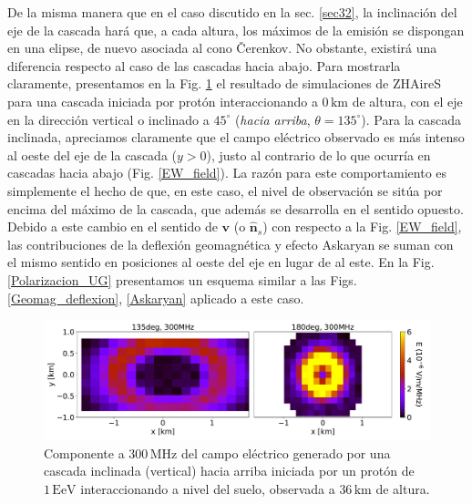 \documentclass[11 pt, a4paper]{article} %
\numberwithin{equation}{section}
\numberwithin{figure}{section}
\numberwithin{table}{section}
\newcommand{\vect}[1]{\boldsymbol{\mathbf{#1}}}
\begin{document}
De la misma manera que en el caso discutido en la sec. \ref{sec32}, la inclinación del eje de la cascada hará que, a cada altura, los máximos de la emisión se dispongan en una elipse, de nuevo asociada al cono \v{C}erenkov. No obstante, existirá una diferencia respecto al caso de las cascadas hacia abajo. Para mostrarla claramente, presentamos en la Fig. \ref{Comparativa_0_45deg} el resultado de simulaciones de ZHAireS para una cascada iniciada por protón interaccionando a $0\,\mathrm{km}$ de altura, con el eje en la dirección vertical o inclinado a $45^\circ$ (\textit{hacia arriba}, $\theta=135^\circ$). Para la cascada inclinada, apreciamos claramente que el campo eléctrico observado es más intenso al oeste del eje de la cascada ($y>0$), justo al contrario de lo que ocurría en cascadas hacia abajo (Fig. \ref{EW_field}). La razón para este comportamiento es simplemente el hecho de que, en este caso, el nivel de observación se sitúa por encima del máximo de la cascada, que además se desarrolla en el sentido opuesto. Debido a este cambio en el sentido de $\vect{v}$ (o $\hat{\vect{n}}_s$) con respecto a la Fig. \ref{EW_field}, las contribuciones de la deflexión geomagnética y efecto Askaryan se suman con el mismo sentido en posiciones al oeste del eje en lugar de al este. En la Fig. \ref{Polarizacion_UG} presentamos un esquema similar a las Figs. \ref{Geomag_deflexion}, \ref{Askaryan} aplicado a este caso.
	\begin{figure}[H]
	\centering
	\includegraphics[width=.9\linewidth]{figures/Radio_UG/Comparativa_0_45deg}
	\caption{Componente a $300\,\mathrm{MHz}$ del campo eléctrico generado por una cascada inclinada (vertical) hacia arriba iniciada por un protón de $1\,\mathrm{EeV}$ interaccionando a nivel del suelo, observada a $36\,\mathrm{km}$ de altura.}
	\label{Comparativa_0_45deg}
\end{figure}
\end{document}
